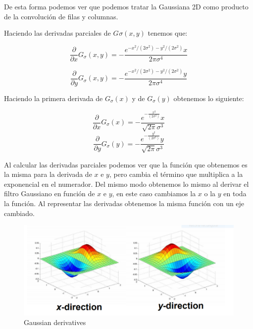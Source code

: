 \documentclass{article}
\begin{document}
De esta forma podemos ver que podemos tratar la Gaussiana 2D como producto de la convolución de filas y columnas.

Haciendo las derivadas parciales de $G_{}\sigma (x,y)$ tenemos que:

\begin{equation}
\frac{\partial}{\partial x} G_{\sigma}(x,y) = -\frac{ e^{-x^2/(2 \sigma^2) - y^2/(2 \sigma^2)} x}{2\pi\sigma^4}
\end{equation}

\begin{equation}
\frac{\partial}{\partial y} G_{\sigma}(x,y) = -\frac{ e^{-x^2/(2 \sigma^2) - y^2/(2 \sigma^2)} y}{2\pi\sigma^4}
\end{equation}

Haciendo la primera derivada de $G_{\sigma}(x)$ y de $G_{\sigma}(y)$ obtenemos lo siguiente:

\begin{equation}
\frac{\partial}{\partial x} G_{\sigma}(x) = -\frac{e^{-\frac{x^2}{(2 \sigma^2)}}x}{\sqrt{2 \pi}\sigma^3}
\end{equation}
\begin{equation}
\frac{\partial}{\partial y} G_{\sigma}(y) = -\frac{e^{-\frac{y^2}{(2 \sigma^2)}}y}{\sqrt{2 \pi}\sigma^3}
\end{equation}

\newpage

Al calcular las derivadas parciales podemos ver que la función que obtenemos es la misma para la derivada de $x$ e $y$, pero cambia el término que multiplica a la exponencial en el numerador. Del mismo modo obtenemos lo mismo al derivar el filtro Gaussiano en función de $x$ e $y$, en este caso cambiamos la $x$ o la $y$ en toda la función. Al representar las derivadas obtenemos la misma función con un eje cambiado.


\begin{figure}[h]
\vspace{0.5cm}
\centering
\includegraphics[scale=0.7]{partial.png}
\caption{Gaussian derivatives}	
\end{figure}
\end{document}

